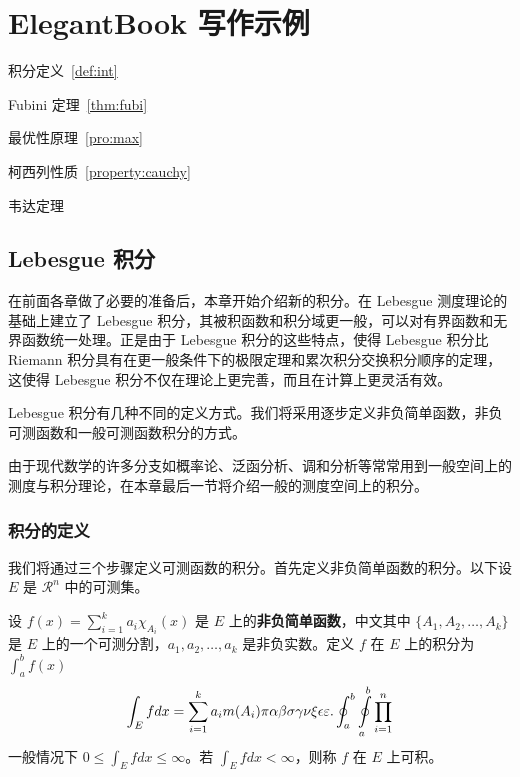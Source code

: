 \chapter{ElegantBook 写作示例}

\begin{introduction}
  \item 积分定义~\ref{def:int}
  \item Fubini 定理~\ref{thm:fubi}
  \item 最优性原理~\ref{pro:max}
  \item 柯西列性质~\ref{property:cauchy}
  \item 韦达定理
\end{introduction}

\section{Lebesgue 积分}
在前面各章做了必要的准备后，本章开始介绍新的积分。在 Lebesgue 测度理论的基础上建立了 Lebesgue 积分，其被积函数和积分域更一般，可以对有界函数和无界函数统一处理。正是由于 Lebesgue 积分的这些特点，使得 Lebesgue 积分比 Riemann 积分具有在更一般条件下的极限定理和累次积分交换积分顺序的定理，这使得 Lebesgue 积分不仅在理论上更完善，而且在计算上更灵活有效。

Lebesgue 积分有几种不同的定义方式。我们将采用逐步定义非负简单函数，非负可测函数和一般可测函数积分的方式。

由于现代数学的许多分支如概率论、泛函分析、调和分析等常常用到一般空间上的测度与积分理论，在本章最后一节将介绍一般的测度空间上的积分。

\subsection{积分的定义}

我们将通过三个步骤定义可测函数的积分。首先定义非负简单函数的积分。以下设 $E$ 是 $\mathcal{R}^n$ 中的可测集。

\begin{definition}[可积性] \label{def:int} 
设 $ f(x)=\sum\limits_{i=1}^{k} a_i \chi_{A_i}(x)$ 是 $E$ 上的\textbf{非负简单函数}，中文其中 $\{A_1,A_2,\ldots,A_k\}$ 是 $E$ 上的一个可测分割，$a_1,a_2,\ldots,a_k$ 是非负实数。定义 $f$ 在 $E$ 上的积分为 $\int_{a}^b f(x)$
\begin{equation}
   \label{inter}
   \int_{E} f dx = \sum_{i=1}^k a_i m(A_i) \pi \alpha\beta\sigma\gamma\nu\xi\epsilon\varepsilon. \oint_{a}^b\ointop_{a}^b\prod_{i=1}^n
\end{equation}
一般情况下 $0 \leq \int_{E} f dx \leq \infty$。若 $\int_{E} f dx < \infty$，则称 $f$ 在 $E$ 上可积。
\end{definition}

